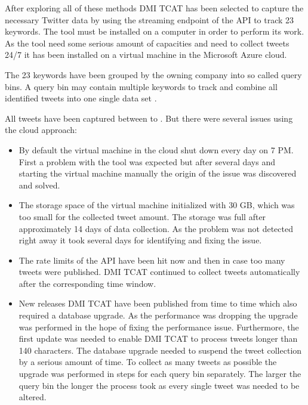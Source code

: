 After exploring all of these methods DMI TCAT has been selected to capture the necessary Twitter data by using the streaming endpoint of the \ac{API} to track 23 keywords.
The tool must be installed on a computer in order to perform its work.
As the tool need some serious amount of capacities and need to collect tweets 24/7 it has been installed on a virtual machine in the Microsoft Azure cloud.

The 23 keywords have been grouped by the owning company into so called query bins.
A query bin may contain multiple keywords to track and combine all identified tweets into one single data set \cite{Borra2014}.

All tweets have been captured between  to .
But there were several issues using the cloud approach:

\begin{itemize}

  \item By default the virtual machine in the cloud shut down every day on 7 PM.
    First a problem with the tool was expected but after several days and starting the virtual machine manually the origin of the issue was discovered and solved.

  \item The storage space of the virtual machine initialized with 30 \ac{GB}, which was too small for the collected tweet amount.
    The storage was full after approximately 14 days of data collection.
    As the problem was not detected right away it took several days for identifying and fixing the issue.

  \item The rate limits of the \ac{API} have been hit now and then in case too many tweets were published.
    DMI TCAT continued to collect tweets automatically after the corresponding time window.

  \item New releases DMI TCAT have been published from time to time which also required a database upgrade.
    As the performance was dropping the upgrade was performed in the hope of fixing the performance issue.
    Furthermore, the first update was needed to enable DMI TCAT to process tweets longer than 140 characters.
    The database upgrade needed to suspend the tweet collection by a serious amount of time.
    To collect as many tweets as possible the upgrade was performed in steps for each query bin separately.
    The larger the query bin the longer the process took as every single tweet was needed to be altered.

\end{itemize}

